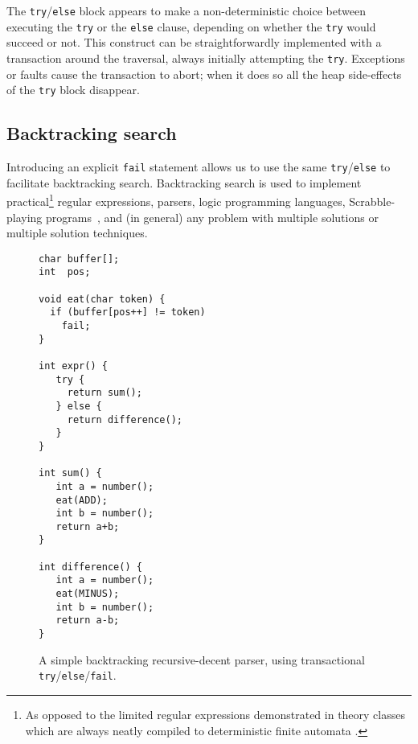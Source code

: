 The {\tt try}/{\tt else} block appears to make a non-deterministic
choice between executing the {\tt try} or the {\tt else} clause,
depending on whether the {\tt try} would succeed or not.
This construct can be straightforwardly implemented
with a transaction around the traversal,
always initially attempting
the {\tt try}.  Exceptions or faults cause the transaction to abort;
when it does so all the
heap side-effects of the {\tt try} block disappear.

\subsection{Backtracking search}\label{sec:backtrack}
Introducing an explicit {\tt fail} statement allows us to use the same
{\tt try}/{\tt else} to facilitate backtracking
search. Backtracking search is used to implement
practical\footnote{As opposed to the limited regular expressions
demonstrated in theory classes which are always neatly compiled to
deterministic finite automata \cite{Friedl02}.} regular expressions,
parsers, logic programming languages, Scrabble-playing
programs~\cite{AppelJa88}, and (in general) any problem with multiple
solutions or multiple solution techniques.

\begin{figure}\sis\fontsize{9}{10}\begin{verbatim}
char buffer[];
int  pos;

void eat(char token) {
  if (buffer[pos++] != token)
    fail;
}

int expr() {
   try {
     return sum();
   } else {
     return difference();
   }
}

int sum() {
   int a = number();
   eat(ADD);
   int b = number();
   return a+b;
}

int difference() {
   int a = number();
   eat(MINUS);
   int b = number();
   return a-b;
}
\end{verbatim}
\caption[A simple backtracking recursive-decent parser.]
{A simple backtracking recursive-decent parser, using transactional \texttt{try}/\texttt{else}/\texttt{fail}.}
\label{fig:backtrack-parser}
\end{figure}

